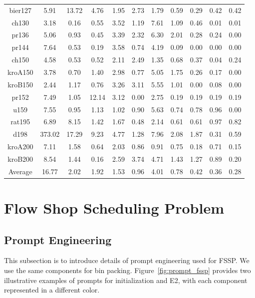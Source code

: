 \begin{table}[htbp]
{\begin{tabular}{ccccccccccc}
bier127  & 5.91   & 13.72 & 4.76  & 1.95 & 2.73 & 1.79 & 0.59 & 0.29 & 0.42 & 0.42 \\
ch130    & 3.18   & 0.16  & 0.55  & 3.52 & 1.19 & 7.61 & 1.09 & 0.46 & 0.01 & 0.01 \\
pr136    & 5.06   & 0.93  & 0.45  & 3.39 & 2.32 & 6.30 & 2.01 & 0.28 & 0.24 & 0.00 \\
pr144    & 7.64   & 0.53  & 0.19  & 3.58 & 0.74 & 4.19 & 0.09 & 0.00 & 0.00 & 0.00 \\
ch150    & 4.58   & 0.53  & 0.52  & 2.11 & 2.49 & 1.35 & 0.68 & 0.37 & 0.04 & 0.24 \\
kroA150  & 3.78   & 0.70  & 1.40  & 2.98 & 0.77 & 5.05 & 1.75 & 0.26 & 0.17 & 0.00 \\
kroB150  & 2.44   & 1.17  & 0.76  & 3.26 & 3.11 & 5.55 & 1.01 & 0.00 & 0.08 & 0.00 \\
pr152    & 7.49   & 1.05  & 12.14 & 3.12 & 0.00 & 2.75 & 0.19 & 0.19 & 0.19 & 0.19 \\
u159     & 7.55   & 0.95  & 1.13  & 1.02 & 0.90 & 5.63 & 0.74 & 0.78 & 0.96 & 0.00 \\
rat195   & 6.89   & 8.15  & 1.42  & 1.67 & 0.48 & 2.14 & 0.61 & 0.61 & 0.97 & 0.82 \\
d198     & 373.02 & 17.29 & 9.23  & 4.77 & 1.28 & 7.96 & 2.08 & 1.87 & 0.31 & 0.59 \\
kroA200  & 7.11   & 1.58  & 0.64  & 2.03 & 0.86 & 0.91 & 0.75 & 0.18 & 0.71 & 0.15 \\
kroB200  & 8.54   & 1.44  & 0.16  & 2.59 & 3.74 & 4.71 & 1.43 & 1.27 & 0.89 & 0.20 \\
\midrule
Average  & 16.77  & 2.02  & 1.92  & 1.53 & 0.96 & 4.01 & 0.78 & 0.42 & 0.36 & 0.28 \\
\bottomrule
\end{tabular}%
}
\end{table}



\section{Flow Shop Scheduling Problem}


\subsection{Prompt Engineering}

This subsection is to introduce details of prompt engineering used for FSSP. We use the same components for bin packing. Figure~\ref{fig:prompt_fssp} provides two illustrative examples of prompts for initialization and E2, with each component represented in a different color. 

